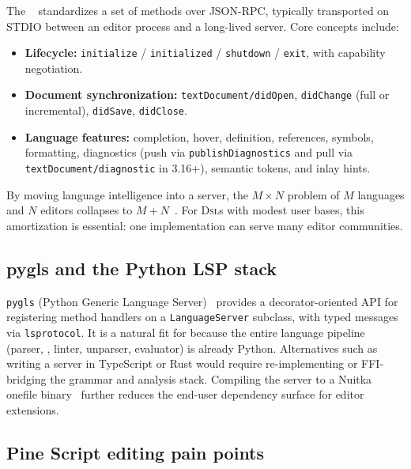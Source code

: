 \documentclass[11pt,a4paper]{article}
\begin{document}
The \lsp{}~\citep{lsp2023} standardizes a set of methods over JSON-RPC, typically
transported on STDIO between an editor process and a long-lived server. Core concepts
include:
\begin{itemize}[leftmargin=*]
  \item \textbf{Lifecycle:} \texttt{initialize} / \texttt{initialized} / \texttt{shutdown}
        / \texttt{exit}, with capability negotiation.
  \item \textbf{Document synchronization:} \texttt{textDocument/didOpen},
        \texttt{didChange} (full or incremental), \texttt{didSave}, \texttt{didClose}.
  \item \textbf{Language features:} completion, hover, definition, references, symbols,
        formatting, diagnostics (push via \texttt{publishDiagnostics} and pull via
        \texttt{textDocument/diagnostic} in 3.16+), semantic tokens, and inlay hints.
\end{itemize}
By moving language intelligence into a server, the \(M \times N\) problem of \(M\)
languages and \(N\) editors collapses to \(M + N\)~\citep{voutilainen2016lsp}. For
\textsc{Dsl}s with modest user bases, this amortization is essential: one implementation
can serve many editor communities.

\subsection{pygls and the Python LSP stack}
\label{sec:bg-pygls}

\texttt{pygls} (Python Generic Language Server)~\citep{murphy2020pygls} provides a
decorator-oriented API for registering \lsp{} method handlers on a
\texttt{LanguageServer} subclass, with typed messages via \texttt{lsprotocol}. It is a
natural fit for \pyne{} because the entire language pipeline (parser, \ast{}, linter,
unparser, evaluator) is already Python. Alternatives such as writing a server in
TypeScript or Rust would require re-implementing or FFI-bridging the grammar and
analysis stack. Compiling the server to a Nuitka onefile binary~\citep{nuitka} further
reduces the end-user dependency surface for editor extensions.

\subsection{Pine Script editing pain points}
\label{sec:bg-pain}
\end{document}
